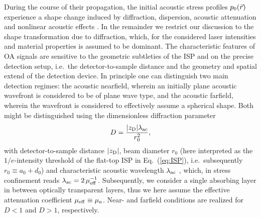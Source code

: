 \documentclass[12pt]{iopart}
\begin{document}
During the course of their propagation, the initial acoustic stress profiles
$p_{\rm 0}(\vec{r})$ experience a shape change induced by diffraction,
dispersion, acoustic attenuation and nonlinear acoustic effects
\cite{Sigrist:1986}.  In the remainder we restrict our discussion to the shape
transformation due to diffraction, which, for the considered laser intensities 
and material properties is assumed to be dominant.
The characteristic features of OA signals are sensitive to the geometric
subtleties of the ISP and on the precise detection setup, i.e.\ the
detector-to-sample distance and the geometry and spatial extend of the
detection device.
In principle one can distinguish two main detection regimes: the acoustic
nearfield, wherein an initially plane acoustic wavefront is considered to be 
of plane wave type, and the acoustic farfield, wherein the wavefront is 
considered to effectively assume a spherical shape.
Both might be distinguished using the dimensionless diffraction parameter 
\begin{equation}
D=\frac{|z_{\rm D}| \lambda_{\rm{ac}}}{r_{\rm 0}^2}, \label{eq:diffpar}
\end{equation}
with detector-to-sample
distance $|z_{\rm{D}}|$, beam diameter $r_0$ (here interpreted as the
$1/e$-intensity threshold of the flat-top ISP in Eq.\ (\ref{eq:ISP}), i.e.\
subsequently $r_0 \equiv a_0+d_0$) and characteristic acoustic wavelength
$\lambda_{\rm{ac}}$ \cite{Sigrist:1986}, which, in stress confinement 
reads $\lambda_{\rm{ac}}=2\, \mu_{\rm{eff}}^{-1}$.  
Subsequently, we consider a single absorbing layer in between optically
transparent layers, thus we here assume the effective attenuation coefficient
$\mu_{\rm{eff}}\equiv \mu_{a}$.
Near- and farfield conditions are realized for $D<1$ and $D>1$, respectively. 
\end{document}
